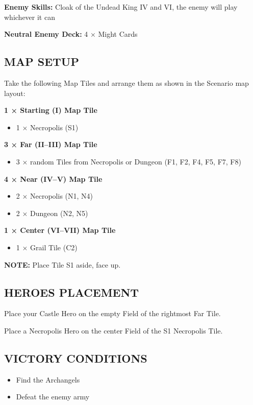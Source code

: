 \begin{multicols}{2}
\textbf{Enemy Skills:} Cloak of the Undead King IV and VI, the enemy will play whichever it can

\textbf{Neutral Enemy Deck:} 4 × Might Cards

\subsection*{\MakeUppercase{Map setup}}

Take the following Map Tiles and arrange them as shown in the Scenario map layout:

\textbf{1 × Starting (I) Map Tile}
\begin{itemize}
    \item 1 × Necropolis (S1)
\end{itemize}

\textbf{3 × Far (II--III) Map Tile}
\begin{itemize}
    \item 3 × random Tiles from Necropolis or Dungeon (F1, F2, F4, F5, F7, F8)
\end{itemize}

\textbf{4 × Near (IV--V) Map Tile}
\begin{itemize}
    \item 2 × Necropolis (N1, N4)
    \item 2 × Dungeon (N2, N5)
\end{itemize}

\textbf{1 × Center (VI--VII) Map Tile}
\begin{itemize}
  \item 1 × Grail Tile (C2)
\end{itemize}

\textbf{\MakeUppercase{Note:}} Place Tile S1 aside, face up.

\subsection*{\MakeUppercase{Heroes placement}}

Place your Castle Hero on the empty Field of the rightmost Far Tile.

Place a Necropolis Hero on the center Field of the S1 Necropolis Tile.

\subsection*{\MakeUppercase{Victory Conditions}}

\begin{itemize}
  \item Find the Archangels
  \item Defeat the enemy army
\end{itemize}



\end{multicols}
